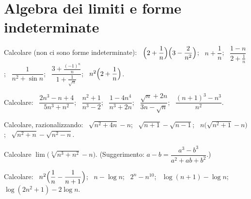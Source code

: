 \section{Algebra dei limiti e forme indeterminate}

\begin{esercizio}[\liv{1}]
Calcolare (non ci sono forme indeterminate): \ $\Bigl(2+\dfrac1n\Bigr)\Bigl(3-\dfrac2{n^2}\Bigr)$; \ $n+\dfrac1n$; \ $\dfrac{1-n}{2+\frac1n}$; \ $\dfrac1{n^2+\sin n}$; \ $\dfrac{3+\frac{(-1)^n}n}{1+\frac1{\sqrt n}}$; \ $n^2\Bigl(2+\dfrac1n\Bigr)$.
\end{esercizio}

\begin{esercizio}[\liv{1}]
Calcolare: \ $\dfrac{2n^3-n+4}{5n^3+n^2}$; \ $\dfrac{n^2+1}{n^3-2}$; \ $\dfrac{1-4n^4}{n^3+2n}$; \ $\dfrac{\sqrt n+2n}{3n-\sqrt n}$; \ $\dfrac{(n+1)^3-n^3}{n^2}$.
\end{esercizio}

\begin{esercizio}[\liv{2}]
Calcolare, razionalizzando: \ $\sqrt{n^2+4n}-n$; \ $\sqrt{n+1}-\sqrt{n-1}$; \ $n\bigl(\sqrt{n^2+1}-n\bigr)$; \ $\sqrt{n^2+n}-\sqrt{n^2-n}$.
\end{esercizio}

\begin{esercizio}[\liv{3}]
Calcolare $\lim\bigl(\sqrt[3]{n^3+n^2}-n\bigr)$. (Suggerimento: $a-b=\dfrac{a^3-b^3}{a^2+ab+b^2}$.)
\end{esercizio}

\begin{esercizio}[\liv{2}]
Calcolare: \ $n^2\Bigl(\dfrac1n-\dfrac1{n+1}\Bigr)$; \ $n-\log n$; \ $2^n-n^{10}$; \ $\log(n+1)-\log n$; \ $\log(2n^2+1)-2\log n$.
\end{esercizio}

